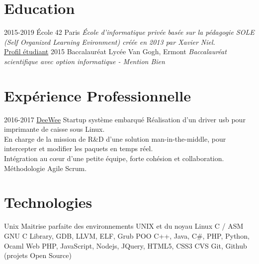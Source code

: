 \documentclass[]{twentysecondcv}
\begin{document}
\section{Education}

\begin{twenty}
  \twentyitem
    {2015-2019}
    {École 42}
    {Paris}
    {
		\emph{École d'informatique privée basée sur la pédagogie SOLE (Self Organized Learning Evironment) créée en 2013 par Xavier Niel.} \\
		\href{https://cv.42.fr/tvermeil}{\textcolor{cerulean}{Profil étudiant}}
	}
  \twentyitem
    {2015}
    {Baccalauréat}
    {Lycée Van Gogh, Ermont}
    {\emph{Baccalauréat scientifique avec option informatique - Mention Bien}}
\end{twenty}


\section{Expérience Professionnelle}

\begin{twentyshort}
  \twentyitem
    {2016-2017}
    {\href{https://www.deewee.net/fr/}{\textcolor{cerulean}{DeeWee}}}
    {Startup système embarqué}
    {
		Réalisation d'un driver usb pour imprimante de caisse sous Linux. \\
		En charge de la mission de R\&D d'une solution man-in-the-middle,
		pour intercepter et modifier les paquets en temps réel. \\
		Intégration au cœur d'une petite équipe, forte cohésion et collaboration. \\
		Méthodologie Agile Scrum.
	}
\end{twentyshort}



\section{Technologies}

\begin{twentyshort}
  \twentyitemshortright
    {Unix}
    {Maitrise parfaite des environnements UNIX et du noyau Linux}
  \twentyitemshortright
    {C / ASM}
    {GNU C Library, GDB, LLVM, ELF, Grub}
  \twentyitemshortright
    {POO}
    {C++, Java, C\#, PHP, Python, Ocaml}
  \twentyitemshortright
    {Web}
    {PHP, JavaScript, Nodejs, JQuery, HTML5, CSS3}
  \twentyitemshortright
    {CVS}
    {Git, Github (projets Open Source)}
\end{twentyshort}
\end{document}
